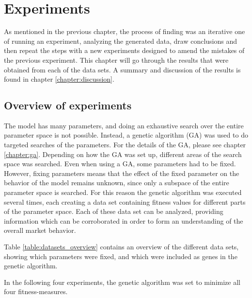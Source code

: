 \chapter{Experiments}\label{chapter:experiments_and_results}
As mentioned in the previous chapter, the process of finding was an iterative one of running an experiment, analyzing the generated data, draw conclusions and then repeat the steps with a new experiments designed to amend the mistakes of the previous experiment. This chapter will go through the results that were obtained from each of the data sets. A summary and discussion of the results is found in chapter \ref{chapter:discussion}.

\section{Overview of experiments}
The model has many parameters, and doing an exhaustive search over the entire parameter space is not possible. Instead, a genetic algorithm (GA) was used to do targeted searches of the parameters. For the details of the GA, please see chapter \ref{chapter:ga}. Depending on how the GA was set up, different areas of the search space was searched. Even when using a GA, some parameters had to be fixed. However, fixing parameters means that the effect of the fixed parameter on the behavior of the model remains unknown, since only a subspace of the entire parameter space is searched. For this reason the genetic algorithm was executed several times, each creating a data set containing fitness values for different parts of the parameter space. Each of these data set can be analyzed, providing information which can be corroborated in order to form an understanding of the overall market behavior.

Table \ref{table:datasets_overview} contains an overview of the different data sets, showing which parameters were fixed, and which were included as genes in the genetic algorithm.

In the following four experiments, the genetic algorithm was set to minimize all four fitness-measures.

